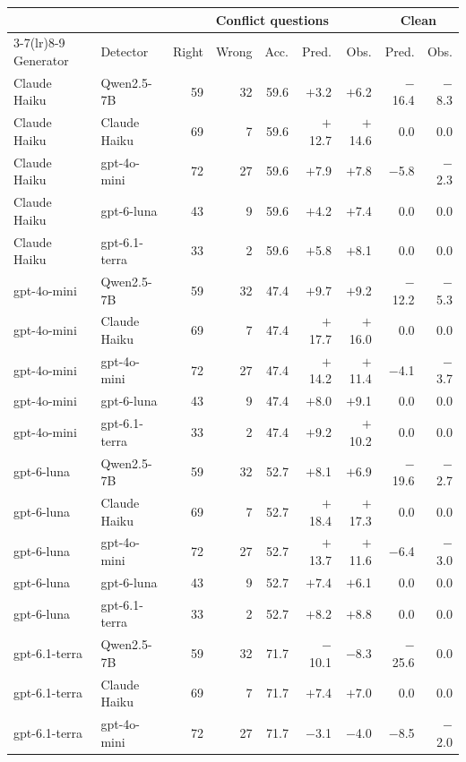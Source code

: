 \begin{table}[t]
\centering\small
\setlength{\tabcolsep}{5pt}
\begin{tabular}{@{}llrrrrrrr@{}}
\toprule
& & \multicolumn{5}{c}{Conflict questions} & \multicolumn{2}{c}{Clean} \\
\cmidrule(lr){3-7}\cmidrule(lr){8-9}
Generator & Detector & Right & Wrong & Acc. & Pred. & Obs. & Pred. & Obs. \\
\midrule
Claude Haiku & Qwen2.5-7B & 59 & 32 & 59.6 & $+$3.2 & $+$6.2 & $-$16.4 & $-$8.3 \\
Claude Haiku & Claude Haiku & 69 & 7 & 59.6 & $+$12.7 & $+$14.6 & 0.0 & 0.0 \\
Claude Haiku & gpt-4o-mini & 72 & 27 & 59.6 & $+$7.9 & $+$7.8 & $-$5.8 & $-$2.3 \\
Claude Haiku & gpt-6-luna & 43 & 9 & 59.6 & $+$4.2 & $+$7.4 & 0.0 & 0.0 \\
Claude Haiku & gpt-6.1-terra & 33 & 2 & 59.6 & $+$5.8 & $+$8.1 & 0.0 & 0.0 \\
gpt-4o-mini & Qwen2.5-7B & 59 & 32 & 47.4 & $+$9.7 & $+$9.2 & $-$12.2 & $-$5.3 \\
gpt-4o-mini & Claude Haiku & 69 & 7 & 47.4 & $+$17.7 & $+$16.0 & 0.0 & 0.0 \\
gpt-4o-mini & gpt-4o-mini & 72 & 27 & 47.4 & $+$14.2 & $+$11.4 & $-$4.1 & $-$3.7 \\
gpt-4o-mini & gpt-6-luna & 43 & 9 & 47.4 & $+$8.0 & $+$9.1 & 0.0 & 0.0 \\
gpt-4o-mini & gpt-6.1-terra & 33 & 2 & 47.4 & $+$9.2 & $+$10.2 & 0.0 & 0.0 \\
gpt-6-luna & Qwen2.5-7B & 59 & 32 & 52.7 & $+$8.1 & $+$6.9 & $-$19.6 & $-$2.7 \\
gpt-6-luna & Claude Haiku & 69 & 7 & 52.7 & $+$18.4 & $+$17.3 & 0.0 & 0.0 \\
gpt-6-luna & gpt-4o-mini & 72 & 27 & 52.7 & $+$13.7 & $+$11.6 & $-$6.4 & $-$3.0 \\
gpt-6-luna & gpt-6-luna & 43 & 9 & 52.7 & $+$7.4 & $+$6.1 & 0.0 & 0.0 \\
gpt-6-luna & gpt-6.1-terra & 33 & 2 & 52.7 & $+$8.2 & $+$8.8 & 0.0 & 0.0 \\
gpt-6.1-terra & Qwen2.5-7B & 59 & 32 & 71.7 & $-$10.1 & $-$8.3 & $-$25.6 & 0.0 \\
gpt-6.1-terra & Claude Haiku & 69 & 7 & 71.7 & $+$7.4 & $+$7.0 & 0.0 & 0.0 \\
gpt-6.1-terra & gpt-4o-mini & 72 & 27 & 71.7 & $-$3.1 & $-$4.0 & $-$8.5 & $-$2.0 \\

\end{tabular}
\end{table}
